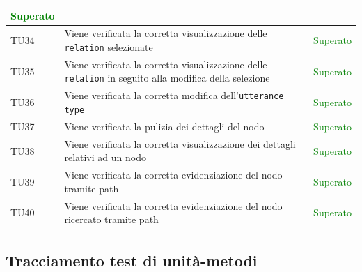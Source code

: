 \documentclass[openany,12pt,a4paper]{report}
\begin{document}
\begin{longtable}[c]{| p{2.5cm} |p{8cm} | p{2.5cm} |}
	\newline \textcolor{green}{Superato}
	\\[1em]
	\hline
	\newline TU34&
	\newline Viene verificata la corretta visualizzazione delle \verb|relation| selezionate&
	\newline \textcolor{green}{Superato}
	\\[1em]
	\hline
	\newline TU35&
	\newline Viene verificata la corretta visualizzazione delle \verb|relation| in seguito alla modifica della selezione&
	\newline \textcolor{green}{Superato}
	\\[1em]
	\hline
	\newline TU36&
	\newline Viene verificata la corretta modifica dell'\verb|utterance type|&
	\newline \textcolor{green}{Superato}
	\\[1em]
	\hline
	\newline TU37&
	\newline Viene verificata la pulizia dei dettagli del nodo&
	\newline \textcolor{green}{Superato}
	\\[1em]
	\hline
	\newline TU38&
	\newline Viene verificata la corretta visualizzazione dei dettagli relativi ad un nodo&
	\newline \textcolor{green}{Superato}
	\\[1em]
	\hline
	\newline TU39&
	\newline Viene verificata la corretta evidenziazione del nodo tramite path&
	\newline \textcolor{green}{Superato}
	\\[1em]
	\hline
	\newline TU40&
	\newline Viene verificata la corretta evidenziazione del nodo ricercato tramite path&
	\newline \textcolor{green}{Superato}
	\\[1em]
	\hline
\end{longtable}

\subsection{Tracciamento test di unità-metodi}
\end{document}
